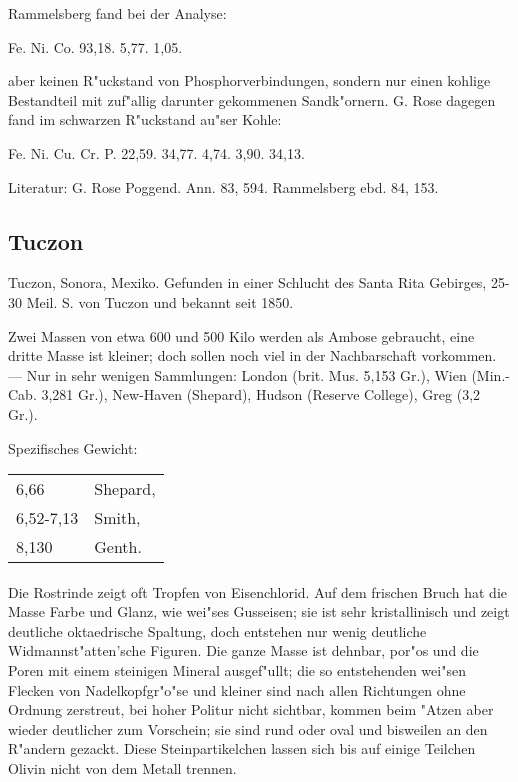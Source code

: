 \documentclass[a4paper, 11pt, oneside]{article}
\begin{document}
Rammelsberg fand bei der Analyse:

Fe. Ni. Co.  
93,18. 5,77. 1,05.

aber keinen R"uckstand von Phosphorverbindungen, sondern nur einen kohlige Bestandteil mit zuf"allig darunter gekommenen Sandk"ornern. G. Rose dagegen fand im schwarzen R"uckstand au"ser Kohle:

Fe. Ni. Cu. Cr. P.  
22,59. 34,77. 4,74. 3,90. 34,13.

Literatur: G. Rose Poggend. Ann. 83, 594. Rammelsberg ebd. 84, 153.

\subsection{Tuczon}

Tuczon, Sonora, Mexiko. Gefunden in einer Schlucht des Santa Rita Gebirges, 25-30 Meil. S. von Tuczon und bekannt seit 1850.

Zwei Massen von etwa 600 und 500 Kilo werden als Ambose gebraucht, eine dritte Masse ist kleiner; doch sollen noch viel in der Nachbarschaft vorkommen. --- Nur in sehr wenigen Sammlungen: London (brit. Mus. 5,153 Gr.), Wien (Min.-Cab. 3,281 Gr.), New-Haven (Shepard), Hudson (Reserve College), Greg (3,2 Gr.).

Spezifisches Gewicht:  
\begin{table}[!ht]
    \centering
    \begin{tabular}{l l}
        6,66 & Shepard,\\
        6,52-7,13 & Smith,\\
        8,130 & Genth.
    \end{tabular}
\end{table}
\paragraph{}
Die Rostrinde zeigt oft Tropfen von Eisenchlorid. Auf dem frischen Bruch hat die Masse Farbe und Glanz, wie wei"ses Gusseisen; sie ist sehr kristallinisch und zeigt deutliche oktaedrische Spaltung, doch entstehen nur wenig deutliche Widmannst"atten'sche Figuren. Die ganze Masse ist dehnbar, por"os und die Poren mit einem steinigen Mineral ausgef"ullt; die so entstehenden wei"sen Flecken von Nadelkopfgr"o"se und kleiner sind nach allen Richtungen ohne Ordnung zerstreut, bei hoher Politur nicht sichtbar, kommen beim "Atzen aber wieder deutlicher zum Vorschein; sie sind rund oder oval und bisweilen an den R"andern gezackt. Diese Steinpartikelchen lassen sich bis auf einige Teilchen Olivin nicht von dem Metall trennen.
\end{document}
